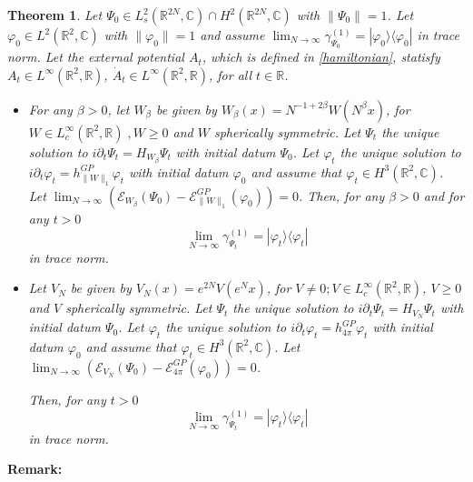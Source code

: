 \documentclass[11pt, english, american]{article}
\newtheorem{theorem}{Theorem}[section]
\renewcommand{\phi}{\varphi}
\begin{document}
\begin{theorem}\label{theo}
Let $\Psi_0 \in L^2_{s}(\mathbb{R}^{2N}, \mathbb{C}) \cap H^2(\mathbb{R}^{2N}, \mathbb{C})$ with $\|\Psi_0\|=1$. Let $\phi_0  \in L^{2}(\mathbb{R}^2,\mathbb{C})$ with $\|\phi_0\|=1$ and assume $\lim_{N\to\infty}\gamma^{(1)}_{\Psi_0}=|\phi_0\rangle\langle\phi_0|$ in trace norm. Let the external potential $A_t$, which is defined in \eqref{hamiltonian}, statisfy
$ A_t
 \in L^\infty (\mathbb{R}^2, \mathbb{R})$, 
$ \dot{A}_t 
 \in L^\infty (\mathbb{R}^2, \mathbb{R}) 
$, for all $t \in \mathbb{R}$.
\begin{itemize}
\item[(a)]
For any $\beta>0$, let $W_\beta$ be given by $W_\beta(x)= N^{-1+2 \beta} W(N^{\beta}x)$, for $W \in 
L^\infty_c (\mathbb{R}^2,\mathbb{R}) \;, W\geq0$ and $W$ spherically symmetric.
Let $\Psi_t$ the unique solution to $i \partial_t \Psi_t
= H_{W_\beta} \Psi_t$ with initial datum $\Psi_0$.  
Let $\phi_t$ the unique solution to $i \partial_t \phi_t
= h^{GP}_{ \|W\|_1} \phi_t$ with initial datum $\phi_0$ and assume that $\phi_t \in H^3(\mathbb{R}^2, \mathbb{C})$. 
Let $
\lim_{N \rightarrow \infty}
\left(
\mathcal{E}_{W_\beta}(\Psi_0)
-
\mathcal{E}_{ \|W\|_1}^ {GP}(\phi_0)
\right)
=0
$.
Then, for any $\beta>0$ and for any $t>0$ 
\begin{equation}
\label{convergenls}
\lim_{N\to\infty}\gamma^{(1)}_{\Psi_t}=|\phi_t\rangle\langle\phi_t|
\end{equation} in trace norm.

\item[(b)]
Let $V_N$ be given by $V_N(x)= e^ {2N} V(e^ {N}x)$, for $V \neq 0; V \in 
L^\infty_c (\mathbb{R}^2,\mathbb{R})$, $V \geq 0$ and $V$ spherically symmetric. 
Let $\Psi_t$ the unique solution to $i \partial_t \Psi_t
= H_{V_N} \Psi_t$ with initial datum $\Psi_0$. 
Let $\phi_t$ the unique solution to $i \partial_t \phi_t
= h^{GP}_{4 \pi} \phi_t$ with initial datum $\phi_0$ and assume that $\phi_t \in H^3(\mathbb{R}^2, \mathbb{C})$. Let $
\lim_{N \rightarrow \infty}
\left(
\mathcal{E}_{V_N}(\Psi_0)
-
\mathcal{E}_{4 \pi}^ {GP}(\phi_0)
\right)
=0
$.

Then,  for any $t>0$ 
\begin{equation}
\label{converge}
\lim_{N\to\infty}\gamma^{(1)}_{\Psi_t}=|\phi_t\rangle\langle\phi_t|
\end{equation} in trace norm.

\end{itemize}
\end{theorem}
\textbf{Remark:}
\end{document}
